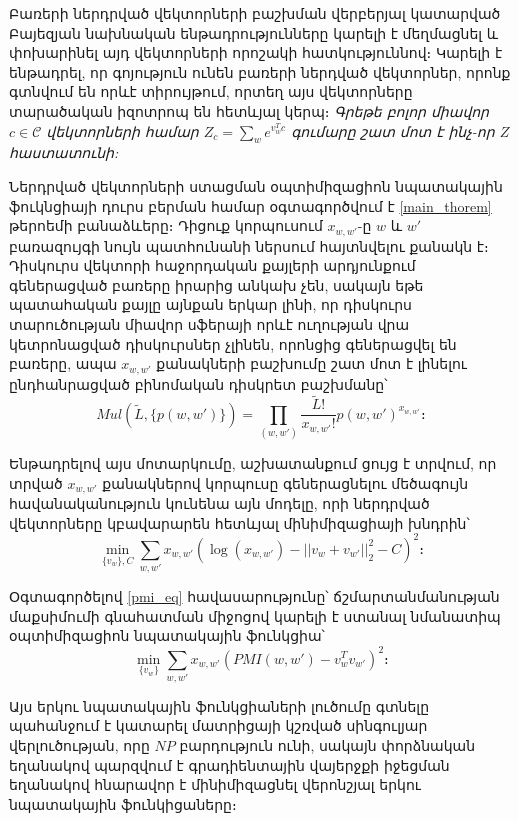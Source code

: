 \documentclass[11pt]{article}
\begin{document}
Բառերի ներդրված վեկտորների բաշխման վերբերյալ կատարված Բայեզյան նախնական ենթադրությունները կարելի է մեղմացնել և փոխարինել այդ վեկտորների որոշակի հատկություննով։ Կարելի է ենթադրել,  որ գոյություն ունեն բառերի ներդված վեկտորներ, որոնք գտնվում են որևէ տիրույթում, որտեղ այս վեկտորները տարածական իզոտրոպ են հետևյալ կերպ։ \textit{Գրեթե բոլոր միավոր $c \in \mathcal{C}$ վեկտորների համար  $Z_c = \sum_w{e^{v^T_wc}}$ գումարը շատ մոտ է ինչ-որ $Z$  հաստատունի:} 
\par Ներդրված վեկտորների ստացման օպտիմիզացիոն նպատակային ֆուկնցիայի դուրս բերման համար  օգտագործվում է \ref{main_thorem} թերոեմի բանաձևերը։ Դիցուք կորպուսում  $x_{w, w'}$-ը $w$ և $w'$ բառազույգի  նույն պատհունանի ներսում հայտնվելու քանակն է։ Դիսկուրս վեկտորի հաջորդական քայլերի արդյունքում գեներացված բառերը իրարից անկախ չեն, սակայն եթե պատահական քայլը այնքան երկար լինի, որ դիսկուրս տարուծության միավոր սֆերայի որևէ ուղության վրա կետրոնացված դիսկուրսներ չլինեն, որոնցից գեներացվել են բառերը, ապա $x_{w, w'}$ քանակների բաշխումը շատ մոտ է լինելու ընդհանրացված բինոմական դիսկրետ բաշխմանը՝
\begin{equation}
Mul(\widetilde L, \{p(w, w')\}) = \prod_{(w, w')}{\frac{\widetilde L!}{x_{w, w'}!}p(w, w')^{x_{w, w'}}}։
\end{equation}

Ենթադրելով այս մոտարկումը, \cite{bib_item_14} աշխատանքում ցույց է տրվում, որ տրված $x_{w, w'}$ քանակներով  կորպուսը գեներացնելու մեծագույն հավանականություն կունենա այն մոդելը, որի ներդրված վեկտորները կբավարարեն հետևյալ մինիմիզացիայի խնդրին՝
\begin{equation}
\min_{\{v_w\}, C}{\sum_{w, w'}{x_{w, w'}} \left(\log(x_{w, w'}) - ||v_w+v_{w'}||_2^2 - C  \right)^2}։
\label{sn_obj_eq}
\end{equation}

Օգտագործելով \ref{pmi_eq} հավասարությունը՝  ճշմարտանմանության մաքսիմումի գնահատման միջոցով կարելի է ստանալ նմանատիպ օպտիմիզացիոն նպատակային ֆունկցիա՝ 
\begin{equation}
\min_{\{v_w\}}{\sum_{w, w'}{x_{w, w'}} \left(PMI(w, w') - v^T_wv_{w'}\right)^2}։
\label{pmi_obj_eq}
\end{equation}

Այս երկու նպատակային ֆունկցիաների լուծումը գտնելը պահանջում է կատարել մատրիցայի կշռված սինգուլյար վերլուծության, որը $NP$ բարդություն ունի, սակայն փորձնական եղանակով պարզվում է գրադիենտային վայերջքի իջեցման եղանակով հնարավոր է մինիմիզացնել վերոնշյալ երկու նպատակային ֆունկիցաները։ 
\end{document}
